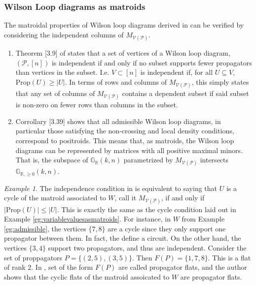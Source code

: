 \documentclass[11pt]{article}
\newcommand{\R}{\mathbb{R}}
\newcommand{\Gr}{\mathbb{G}_{\R, \geq 0}}
\newcommand{\Grall}{\mathbb{G}_{\R}}
\newcommand{\cP}{\mathcal{P}}
\newcommand{\cV}{\mathcal{V}}
\newcommand{\VP}{\cV(\cP)}
\newcommand{\Prop}{\textrm{Prop}}
\theoremstyle{remark}
\newtheorem{eg}[thm]{Example}
\theoremstyle{definition}
\begin{document}
\subsubsection{Wilson Loop diagrams as matroids} 
The matroidal properties of Wilson loop diagrams derived in \cite{Wilsonloops}  can be verified by considering the independent columns of $M_{\VP}$.
\begin{enumerate} 
\item Theorem [3.9] of \cite{wilsonloops} states that a set of vertices of a Wilson loop diagram, $(\cP, [n])$  is independent if and only if no subset supports fewer propagators than vertices in the subset. I.e. $V \subset [n]$ is independent if, for all $U \subseteq V$, $\Prop(U) \geq |U|$. In terms of rows and columns of $M_{\VP}$, this simply states that any set of columns of $M_{\VP}$ contains a dependent subset if said subset is non-zero on fewer rows than columns in the subset.
\item Corrollary [3.39] shows that all admissible Wilson loop diagrams, in particular those satisfying the non-crossing and local density conditions, correspond to positroids. This means that, as matroids, the Wilson loop diagrams can be represented by matrices with all positive maximal minors. That is, the subspace of $\Grall(k,n)$ parametrized by $M_{\VP}$ intersects $\Gr(k,n)$.
\end{enumerate}


\begin{eg}\label{eg:wldmatroid}The independence condition in \cite[Theorem 3.9]{wilsonloops} is equivalent to saying that $U$ is a cycle of the matroid associated to $W$, call it $M_{\VP}$, if and only if  $|\Prop (U)| \leq |U|$. This is exactly the same as the cycle condition laid out in Example \ref{eg:variablevaluesasmatroids}. For instance, in $W$  from Example \ref{eg:admissible}, the vertices $\{7,8\}$ are a cycle since they only support one propagator between them. In fact, the define a circuit. On the other hand, the vertices $\{3,4\}$ support two propagators, and thus are independent. Consider the set of proppagators $P = \{ (2, 5), (3, 5)\}$. Then $F(P) = \{ 1, 7, 8\}$. This is a flat of rank $2$. In \cite{wilsonloops}, set of the form $F(P)$ are called propagator flats, and the author shows that the cyclic flats of the matroid assoicated to $W$ are propagator flats.
 \end{eg}
\end{document}
